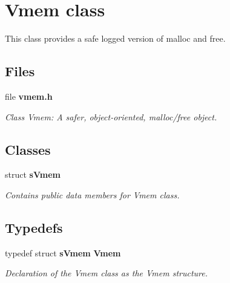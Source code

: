 \section{Vmem class}
\label{a00029}


This class provides a safe logged version of malloc and free.  


\subsection*{Files}
\begin{DoxyCompactItemize}
\item 
file {\bf vmem.\-h}
\begin{DoxyCompactList}\small\item\em Class Vmem\-: A safer, object-\/oriented, malloc/free object. \end{DoxyCompactList}\end{DoxyCompactItemize}
\subsection*{Classes}
\begin{DoxyCompactItemize}
\item 
struct {\bf s\-Vmem}
\begin{DoxyCompactList}\small\item\em Contains public data members for Vmem class. \end{DoxyCompactList}\end{DoxyCompactItemize}
\subsection*{Typedefs}
\begin{DoxyCompactItemize}
\item 
typedef struct {\bf s\-Vmem} {\bf Vmem}
\begin{DoxyCompactList}\small\item\em Declaration of the Vmem class as the Vmem structure. \end{DoxyCompactList}\end{DoxyCompactItemize}
